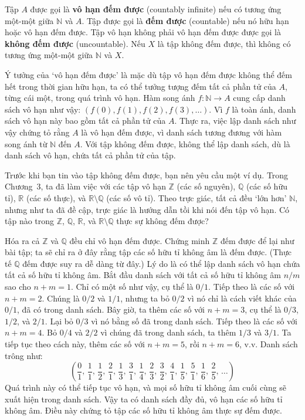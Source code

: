Tập $A$ được gọi là \textbf{vô hạn đếm được} (countably infinite) nếu có tương ứng một-một giữa $\mathbb{N}$ và $A$. Tập được gọi là \textbf{đếm được} (countable) nếu nó hữu hạn hoặc vô hạn đếm được. Tập vô hạn không phải vô hạn đếm được được gọi là \textbf{không đếm được} (uncountable). Nếu $X$ là tập không đếm được, thì không có tương ứng một-một giữa $\mathbb{N}$ và $X$.

Ý tưởng của `vô hạn đếm được' là mặc dù tập vô hạn đếm được không thể đếm hết trong thời gian hữu hạn, ta có thể tưởng tượng đếm tất cả phần tử của $A$, từng cái một, trong quá trình vô hạn. Hàm song ánh $f\colon \mathbb{N} \to A$ cung cấp danh sách vô hạn như vậy: $(f(0), f(1), f(2), f(3), \ldots)$. Vì $f$ là toàn ánh, danh sách vô hạn này bao gồm tất cả phần tử của $A$. Thực ra, việc lập danh sách như vậy chứng tỏ rằng $A$ là vô hạn đếm được, vì danh sách tương đương với hàm song ánh từ $\mathbb{N}$ đến $A$. Với tập không đếm được, không thể lập danh sách, dù là danh sách vô hạn, chứa tất cả phần tử của tập.

Trước khi bạn tin vào tập không đếm được, bạn nên yêu cầu một ví dụ. Trong Chương~3, ta đã làm việc với các tập vô hạn $\mathbb{Z}$ (các số nguyên), $\mathbb{Q}$ (các số hữu tỉ), $\mathbb{R}$ (các số thực), và $\mathbb{R} \setminus \mathbb{Q}$ (các số vô tỉ). Theo trực giác, tất cả đều `lớn hơn' $\mathbb{N}$, nhưng như ta đã đề cập, trực giác là hướng dẫn tồi khi nói đến tập vô hạn. Có tập nào trong $\mathbb{Z}$, $\mathbb{Q}$, $\mathbb{R}$, và $\mathbb{R} \setminus \mathbb{Q}$ thực sự không đếm được?

Hóa ra cả $\mathbb{Z}$ và $\mathbb{Q}$ đều chỉ vô hạn đếm được. Chứng minh $\mathbb{Z}$ đếm được để lại như bài tập; ta sẽ chỉ ra ở đây rằng tập các số hữu tỉ không âm là đếm được. (Thực tế $\mathbb{Q}$ đếm được suy ra dễ dàng từ đây.) Lý do là có thể lập danh sách vô hạn chứa tất cả số hữu tỉ không âm. Bắt đầu danh sách với tất cả số hữu tỉ không âm $n/m$ sao cho $n + m = 1$. Chỉ có một số như vậy, cụ thể là $0/1$. Tiếp theo là các số với $n + m = 2$. Chúng là $0/2$ và $1/1$, nhưng ta bỏ $0/2$ vì nó chỉ là cách viết khác của $0/1$, đã có trong danh sách. Bây giờ, ta thêm các số với $n + m = 3$, cụ thể là $0/3$, $1/2$, và $2/1$. Lại bỏ $0/3$ vì nó bằng số đã trong danh sách. Tiếp theo là các số với $n + m = 4$. Bỏ $0/4$ và $2/2$ vì chúng đã trong danh sách, ta thêm $1/3$ và $3/1$. Ta tiếp tục theo cách này, thêm các số với $n + m = 5$, rồi $n + m = 6$, v.v. Danh sách trông như:
\[
\left(\frac{0}{1},\, \frac{1}{1},\, \frac{1}{2},\, \frac{2}{1},\, \frac{1}{3},\, \frac{3}{1},\, \frac{1}{4},\, \frac{2}{3},\, \frac{3}{2},\, \frac{4}{1},\, \frac{1}{5},\, \frac{5}{1},\, \frac{1}{6},\, \frac{2}{5},\, \ldots\right)
\]
Quá trình này có thể tiếp tục vô hạn, và mọi số hữu tỉ không âm cuối cùng sẽ xuất hiện trong danh sách. Vậy ta có danh sách đầy đủ, vô hạn các số hữu tỉ không âm. Điều này chứng tỏ tập các số hữu tỉ không âm thực sự đếm được.

